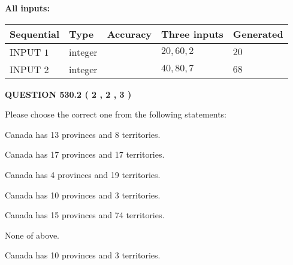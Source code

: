 \documentclass[12pt]{article}
\begin{document}
   
   
   
\noindent{}
   
   
   
   
\noindent\vspace{0.1in}\hspace{-0.08in} {\textbf{\Large{All inputs: }}}
   
   
  
  
\noindent\begin{tabular}{|l|l|l|l|l|}
\hline
 Sequential & Type & Accuracy & Three inputs & Generated \\ 
\hline
 
 
  INPUT $  1 $ & integer &  & $
 20
 , 
 60
 , 
 2
 $ & $ 20 $ 
 \\  \hline  
 
 
  INPUT $  2 $ & integer &  & $
 40
 , 
 80
 , 
 7
 $ & $ 68 $ 
 \\  \hline  
 \end{tabular}
   
   
  
\vspace{0.2in}
  
{\textbf{\Large{QUESTION
530.2 
 ( 2 , 2 , 3 )
}}}
  
  
Please choose the correct one from the following statements:
 
 
Canada has  13 provinces and  8 territories.
 
 
Canada has  17 provinces and  17 territories.
 
 
Canada has   4 provinces and  19 territories.
 
 
Canada has 10  provinces and 3 territories.
 
 
Canada has  15 provinces and  74 territories.
 
 
 None of above.
 
 
\noindent{}
 
 
Canada has 10  provinces and 3 territories.
 
 
\noindent{}
 
 
   
\end{document}
